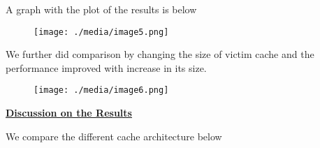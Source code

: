 \documentclass[12pt]{article}
\begin{document}

\par

{\fontsize{14pt}{16.8pt}\selectfont A graph with the plot of the results is below\par}\par




\begin{figure}[H]
	\begin{Center}
		\texttt{[image: ./media/image5.png]}
	\end{Center}
\end{figure}



\par

{\fontsize{14pt}{16.8pt}\selectfont We further did comparison by changing the size of victim cache and the performance improved with increase in its size.\par}\par




\begin{figure}[H]
	\begin{Center}
		\texttt{[image: ./media/image6.png]}
	\end{Center}
\end{figure}






\newpage
\par


\vspace{\baselineskip}
{\fontsize{22pt}{26.4pt}\selectfont \textbf{\uline{Discussion on the Results}}\par}\par

{\fontsize{14pt}{16.8pt}\selectfont We compare the different cache architecture below \par}\par
\end{document}
